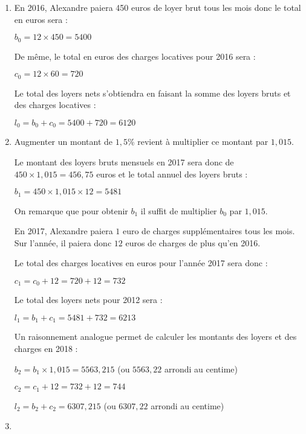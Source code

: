 \begin{corrige}
     \begin{enumerate}
          \item
          En 2016, Alexandre paiera 450 euros de loyer brut tous les mois donc le total en euros sera :
          \par
          $b_0=12 \times 450=5400$
          \par
          De même, le total en euros des charges locatives pour 2016 sera :
          \par
          $c_0=12 \times 60=720$
          \par
          Le total des loyers nets s'obtiendra en faisant la somme des loyers bruts et des charges locatives :
          \par
          $l_0=b_0+c_0=5400+720=6120$
          \item
          Augmenter un montant de $1,5$\% revient à multiplier ce montant par $1,015$.
          \par
          Le montant des loyers bruts mensuels en 2017 sera donc de $450 \times 1,015 = 456,75$ euros et le total annuel des loyers bruts :
          \par
          $b_1=450 \times 1,015 \times 12 = 5481$
          \par
          On remarque que pour obtenir $b_1$ il suffit de multiplier $b_0$ par $1,015$.
          \par
          En 2017, Alexandre paiera $1$ euro de charges supplémentaires tous les mois. Sur l'année, il paiera donc $12$ euros de charges de plus qu'en 2016.
          \par
          Le total des charges locatives en euros pour l'année 2017 sera donc :
          \par
          $c_1=c_0+12=720+12=732$
          \par
          Le total des loyers nets pour 2012 sera :
          \par
          $l_1=b_1+c_1=5481+732=6213$
          \par
          Un raisonnement analogue permet de calculer les montants des loyers et des charges en 2018 :
          \par
          $b_2=b_1 \times 1,015=5563,215$ (ou $5563,22$ arrondi au centime)
          \par
          $c_2=c_1+12=732+12=744$
          \par
          $l_2=b_2+c_2=6307,215$ (ou $6307,22$ arrondi au centime)
          \item

\end{enumerate}
\end{corrige}

